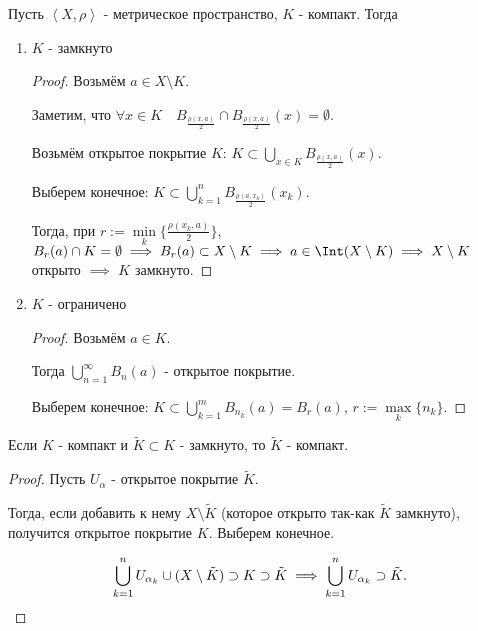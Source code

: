 \begin{theorem} \thmslashn

    Пусть $\left<X, \rho\right>$ - метрическое пространство, $K$ - компакт. Тогда

    \begin{enumerate}
        \item $K$ - замкнуто
            \begin{proof} \thmslashn
            
                Возьмём $a\in X \setminus K$.

                Заметим, что $\forall{x\in K}\quad B_{\frac{\rho(x, a)}{2}} \cap  B_{\frac{\rho(x, a)}{2}}(x) = \emptyset$.

                Возьмём открытое покрытие $K$: $K \subset \bigcup\limits_{x\in K} B_{\frac{\rho(x, a)}{2}}(x)$.

                Выберем конечное: $K \subset \bigcup\limits_{k = 1}^{n} B_{\frac{\rho(a, x_{k})}{2}}(x_{k})$.

                Тогда, при $r := \min\limits_{k} \{\frac{\rho(x_{k}, a)}{2}\}$, $B_{r}(a)\cap K = \emptyset \implies B_{r}(a) \subset X \setminus K \implies a\in \Int (X \setminus K) \implies X \setminus K$ открыто $\implies$ $K$ замкнуто.
            \end{proof}
        \item $K$ - ограничено
            \begin{proof} \thmslashn
            
                Возьмём $a\in K$.

                Тогда $\bigcup_{n = 1}^{\infty} B_{n}(a)$ - открытое покрытие.

                Выберем конечное: $K \subset \bigcup_{k=1}^{m} B_{n_{k}}(a) = B_{r}(a) $, $r := \max\limits_{k} \{n_{k}\} $.
            \end{proof}
    \end{enumerate}
\end{theorem}
\begin{consequence} \thmslashn

    Если $K$ - компакт и $\tilde{K} \subset K$ - замкнуто, то $\tilde{K}$ - компакт.
    \begin{proof} \thmslashn
    
        Пусть $U_{\alpha}$ - открытое покрытие $\tilde{K}$.

        Тогда, если добавить к нему $X \setminus \tilde{K}$ (которое открыто так-как $\tilde{K}$ замкнуто), получится открытое покрытие $K$. Выберем конечное.

        \[ \bigcup_{k=1}^{n} U_{\alpha_{k}} \cup (X \setminus \tilde{K}) \supset K \supset \tilde{K} \implies \bigcup_{k=1}^{n} U_{\alpha_{k}} \supset \tilde{K} \qedhere .\] 
    \end{proof}
\end{consequence}
